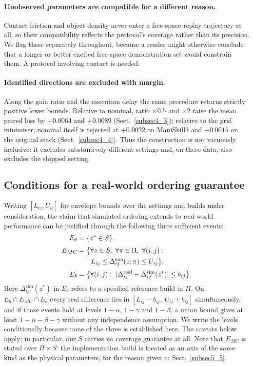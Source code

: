 \documentclass[pdflatex,iicol,sn-apa]{sn-jnl}
\theoremstyle{remark}
\begin{document}
\begin{appendices}
\paragraph{Unobserved parameters are compatible for a different reason.}
Contact friction and object density never enter a free-space replay trajectory at all, so their
compatibility reflects the protocol's coverage rather than its precision. We flag these
separately throughout, because a reader might otherwise conclude that a longer or better-excited
free-space demonstration set would constrain them. A protocol involving contact is needed.

\paragraph{Identified directions are excluded with margin.}
Along the gain ratio and the execution delay the same procedure returns strictly positive lower
bounds. Relative to nominal, ratio $\times 0.5$ and $\times 2$ raise the mean paired loss by
$+0.0064$ and $+0.0089$ (Sect.~\ref{subsec4_3}); relative to the grid minimiser, nominal itself is
rejected at $+0.0022$ on ManiSkill3 and $+0.0015$ on the original stack
(Sect.~\ref{subsec4_4}). Thus the construction is not vacuously inclusive: it excludes
substantively different settings and, on these data, also excludes the shipped setting.

\subsection{Conditions for a real-world ordering guarantee}\label{secA2}

Writing $[L_{ij}, U_{ij}]$ for envelope bounds over the settings and builds under consideration,
the claim that
simulated ordering extends to real-world performance can be justified through the following three
sufficient events:
\begin{align}
E_\theta &= \{ z^* \in S \}, \\[2pt]
E_{MC}   &= \big\{ \forall z \in S,\ \forall \pi \in \Pi,\ \forall (i,j): \notag \\
         &\qquad L_{ij} \le \Delta^{\mathrm{sim}}_{ij}(z; \pi)
                 \le U_{ij} \big\}, \\[2pt]
E_b      &= \big\{ \forall (i,j):\ |\Delta^{\mathrm{real}}_{ij} -
             \Delta^{\mathrm{sim}}_{ij}(z^*)| \le b_{ij} \big\},
\end{align}
Here $\Delta^{\mathrm{sim}}_{ij}(z^*)$ in $E_b$ refers to a specified reference build in $\Pi$.
On $E_\theta \cap E_{MC} \cap E_b$ every real difference lies in
$[L_{ij} - b_{ij},\ U_{ij} + b_{ij}]$ simultaneously, and if those events hold at levels
$1-\alpha$, $1-\gamma$ and $1-\beta$, a union bound gives at least $1 - \alpha - \beta - \gamma$
without any independence assumption. We write the levels conditionally because none of the three is
established here. The caveats below apply; in particular, our $S$ carries no coverage
guarantee at all. Note that $E_{MC}$ is stated over $\Pi \times S$: the implementation build is
treated as an axis of the same kind as the physical parameters, for the reason given in
Sect.~\ref{subsec5_5}.


\end{appendices}
\end{document}
